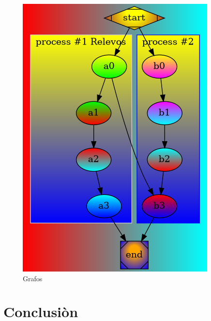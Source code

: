 \documentclass[english]{article}
\begin{document}
\begin{figure}[ht]\centering %
\includegraphics[width=\linewidth]{ciclismo}
\caption{Grafos}
\label{fig:view}
\end{figure}

\section{Conclusiòn}
\end{document}
